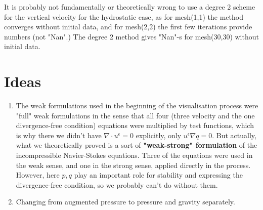 \documentclass[11pt]{article}
\begin{document}
It is probably not fundamentally or theoretically wrong to use a degree 2 scheme for the vertical velocity for the hydrostatic case, as for mesh(1,1) the method converges without initial data, and for mesh(2,2) the first few iterations provide numbers (not "Nan".) The degree 2 method gives "Nan"-s for mesh(30,30) without initial data.

\section{Ideas}

\begin{enumerate}
  \item The weak formulations used in the beginning  of the visualisation process were "full" weak formulations in the sense that all four (three velocity and the one divergence-free condition) equations were multiplied by test functions, which is why there we didn't have $\nabla \cdot u^\epsilon = 0$ explicitly, only $u^\epsilon \nabla q = 0.$ But actually, what we theoretically proved is a sort of \textbf{"weak-strong" formulation} of the incompressible Navier-Stokes equations. Three of the equations were used in the weak sense, and one in the strong sense, applied directly in the process. However, here $p, q$ play an important role for stability and expressing the divergence-free condition, so we probably can't do without them.
  \item Changing from augmented pressure to pressure and gravity separately.
\end{enumerate}
\end{document}

